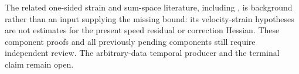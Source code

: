 The related one-sided strain and sum-space literature, including
\cite{Miller2021Sum}, is background rather than an input supplying the
missing bound: its velocity-strain hypotheses are not estimates for the
present speed residual or correction Hessian. These component proofs and
all previously pending components still require independent review.
The arbitrary-data temporal producer and the terminal claim remain open.
